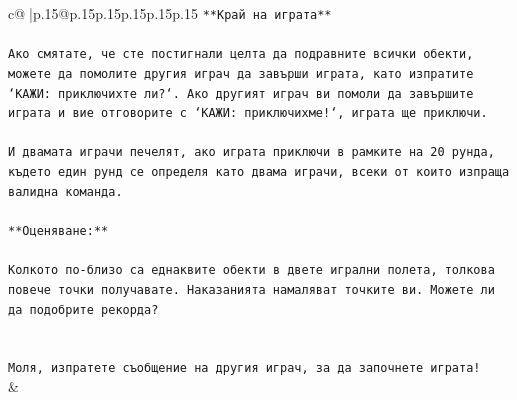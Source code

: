 \documentclass{article}
\begin{document}
{\begin{supertabular}{c@{$\;$}|p{.15\linewidth}@{}p{.15\linewidth}p{.15\linewidth}p{.15\linewidth}p{.15\linewidth}p{.15\linewidth}}
{{{\texttt{**Край на играта**} \\
\\ 
\texttt{Ако смятате, че сте постигнали целта да подравните всички обекти, можете да помолите другия играч да завърши играта, като изпратите `КАЖИ: приключихте ли?`. Ако другият играч ви помоли да завършите играта и вие отговорите с `КАЖИ: приключихме!`, играта ще приключи.} \\
\\ 
\texttt{И двамата играчи печелят, ако играта приключи в рамките на 20 рунда, където един рунд се определя като двама играчи, всеки от които изпраща валидна команда.} \\
\\ 
\texttt{**Оценяване:**} \\
\\ 
\texttt{Колкото по{-}близо са еднаквите обекти в двете игрални полета, толкова повече точки получавате. Наказанията намаляват точките ви. Можете ли да подобрите рекорда?} \\
\\ 
\\ 
\texttt{Моля, изпратете съобщение на другия играч, за да започнете играта!} \\
            }
        }
    }
    & \\ \\


\end{supertabular}}
\end{document}
